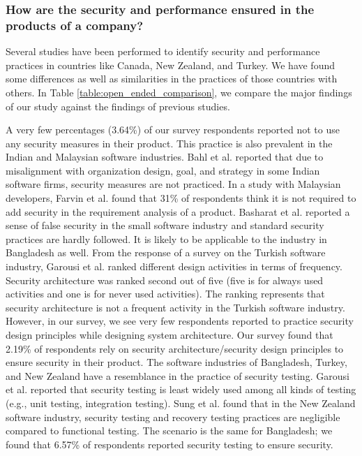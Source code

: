 \subsubsection{How are the security and performance ensured in the products of a company?}

Several studies have been performed to identify security and performance practices in countries like Canada, New Zealand, and Turkey. We have found some differences as well as similarities in the practices of those countries with others. In Table \ref{table:open_ended_comparison}, we compare the major findings of our study against the findings of previous studies.


\label{security_comparison}
A very few percentages (3.64\%) of our survey respondents reported not to use any security measures in their product. This practice is also prevalent in the Indian and Malaysian software industries. Bahl et al.\cite{Bahl2011} reported that due to misalignment with organization design, goal, and strategy in some Indian software firms, security measures are not practiced. In a study with Malaysian developers, Farvin et al.\cite{Farvin2016} found that 31\% of respondents think it is not required to add security in the requirement analysis of a product. Basharat et al.\cite{Basharat2013} reported a sense of false security in the small software industry and standard security practices are hardly followed. It is likely to be applicable to the industry in Bangladesh as well. From the response of a survey on the Turkish software industry, Garousi et al.\cite{Garousi2015} ranked different design activities in terms of frequency. Security architecture was ranked second out of five (five is for always used activities and one is for never used activities). The ranking represents that security architecture is not a frequent activity in the Turkish software industry. However, in our survey, we see very few respondents reported to practice security design principles while designing system architecture. Our survey found that 2.19\% of respondents rely on security architecture/security design principles to ensure security in their product. The software industries of Bangladesh, Turkey, and New Zealand have a resemblance in the practice of security testing. Garousi et al.\cite{Garousi2015} reported that security testing is least widely used among all kinds of testing (e.g., unit testing, integration testing). Sung et al.\cite{Sung2006} found that in the New Zealand software industry, security testing and recovery testing practices are negligible compared to functional testing. The scenario is the same for Bangladesh; we found that 6.57\% of respondents reported security testing to ensure security.


